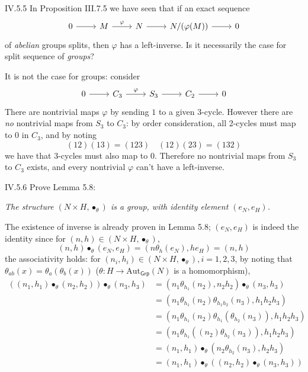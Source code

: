 \begin{problem}{IV.5.5}
In Proposition III.7.5 we have seen that if an exact sequence
\[
\begin{tikzcd}
0 \arrow[r] &M \arrow[r, "\varphi"] &N \arrow[r] &N/(\varphi(M)) \arrow[r] &0
\end{tikzcd}	
\]
of \emph{abelian} groups splits, then $\varphi$ has a left-inverse. Is it necessarily the case for split sequence of \emph{groups}?
\end{problem}
\begin{sol}
It is not the case for groups: consider
\[
\begin{tikzcd}
0 \arrow[r] &C_3 \arrow[r, "\varphi"] &S_3 \arrow[r] &C_2 \arrow[r] &0
\end{tikzcd}
\]
There are nontrivial maps $\varphi$ by sending $1$ to a given 3-cycle. However there are \emph{no} nontrivial maps from $S_3$ to $C_3$: by order consideration, all 2-cycles must map to $0$ in $C_3$, and by noting
\[
(12)(13) = (1 2 3) \quad (1 2)(2 3) = (1 3 2)
\]
we have that 3-cycles must also map to $0$. Therefore no nontrivial maps from $S_3$ to $C_3$ exists, and every nontrivial $\varphi$ can't have a left-inverse. 
\end{sol}

\begin{problem}{IV.5.6}
Prove Lemma 5.8: 

\textit{
The structure $(N \times H, \bullet_\theta)$ is a group, with identity element $(e_N, e_H)$.
}
\end{problem}
\begin{pf}
The existence of inverse is already proven in Lemma 5.8; $(e_N, e_H)$ is indeed the identity since for $(n,h)\in (N \times H, \bullet_\theta)$,
\[
(n, h) \bullet_\theta (e_N, e_H) = (n\theta_h(e_N), he_H) = (n, h)
\]
the associativity holds: for $(n_i,h_i)\in (N \times H, \bullet_\theta), i = 1,2,3$, by noting that $\theta_{ab}(x) = \theta_a(\theta_b(x))$ ($\theta : H \to \text{Aut}_\mathsf{Grp}(N)$ is a homomorphism), 
\begin{align*}
((n_1, h_1) \bullet_\theta (n_2, h_2)) \bullet_\theta (n_3,h_3) &= (n_1 \theta_{h_1}(n_2), n_2h_2) \bullet_\theta (n_3,h_3) \\
&= (n_1 \theta_{h_1}(n_2) \theta_{h_1h_2}(n_3), h_1h_2h_3) \\
&= (n_1 \theta_{h_1}(n_2) \theta_{h_1}(\theta_{h_2}(n_3)), h_1h_2h_3) \\
&= (n_1 \theta_{h_1}((n_2)\theta_{h_2}(n_3)), h_1h_2h_3) \\
&= (n_1, h_1) \bullet_\theta (n_2\theta_{h_2}(n_3), h_2h_3) \\
&= (n_1, h_1) \bullet_\theta ((n_2, h_2) \bullet_\theta (n_3,h_3))
\end{align*}
\end{pf}

